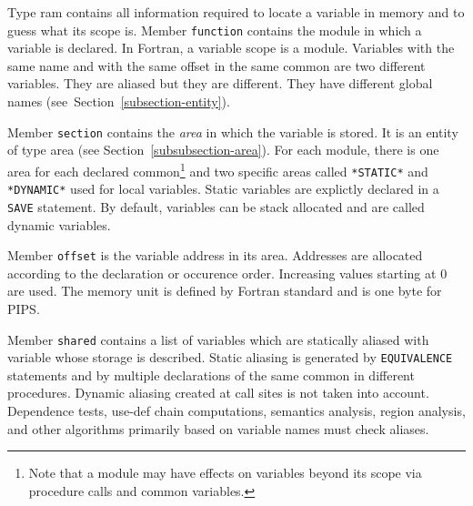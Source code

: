 Type {ram} contains all information required to locate a variable in
memory and to guess what its scope is. Member {\tt function} contains
the module in which a variable is declared. In Fortran, a variable scope
is a module. Variables with the same name and with the same offset in
the same common are two different variables. They are aliased but they
are different. They have different global names
(see~Section~\ref{subsection-entity}).

Member {\tt section} contains the {\em area} in which the variable is
stored. It is an entity of type area (see
Section~\ref{subsubsection-area}). For each module, there is one area
for each declared common\footnote{Note that a module may have effects on
variables beyond its scope via procedure calls and common variables.}
and two specific areas called \verb/*STATIC*/ and \verb/*DYNAMIC*/ used
for local variables. Static variables are explictly declared in a {\tt
SAVE} statement. By default, variables can be stack allocated and are
called dynamic variables.

Member {\tt offset} is the variable address in its area. Addresses are
allocated according to the declaration or occurence order. Increasing
values starting at 0 are used. The memory unit is defined by Fortran
standard and is one byte for PIPS.

Member {\tt shared} contains a list of variables which are statically
aliased with variable whose storage is described. Static aliasing is
generated by {\tt EQUIVALENCE} statements and by multiple declarations
of the same common in different procedures. Dynamic aliasing created at
call sites is not taken into account. Dependence tests, use-def chain
computations, semantics analysis, region analysis, and other algorithms
primarily based on variable names must check aliases.

\iffalse
Le domaine \verb/ram/ permet de pre'ciser la de'claration d'une
variable. Le sous-domaine \verb/function/ indique dans quel module une
entite' est de'clare'e. Le sous-domaine \verb/section/ indique dans
quelle aire une entite' est stocke'e; il y a une aire par common
de'clare' et deux aires spe'ciales nomme'es \verb/STATIC/ et
\verb/DYNAMIC/ pour les entite's locales. Le sous-domaine \verb/offset/
donne l'adresse dans l'aire de la variable. Enfin, le sous-domaine {\tt
shared} donne la liste des entite's qui partagent statiquement un
morceau d'espace me'moire avec la variable concerne'. En Fortran, le
partage de me'moire vient des equivalences entre variables.
\fi

